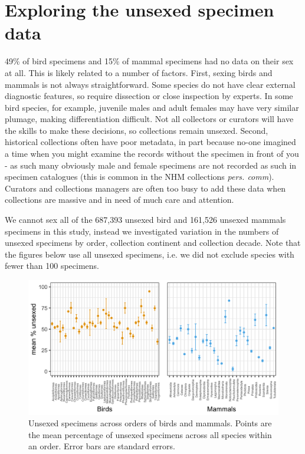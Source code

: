 \documentclass[a4paper, 12pt]{article}
\begin{document}
\newpage
\section{Exploring the unsexed specimen data}

49\% of bird specimens and 15\% of mammal specimens had no data on their sex at all. This is likely related to a number of factors. 
First, sexing birds and mammals is not always straightforward. Some species do not have clear external diagnostic features, so require dissection or close inspection by experts. 
In some bird species, for example, juvenile males and adult females may have very similar plumage, making differentiation difficult. 
Not all collectors or curators will have the skills to make these decisions, so collections remain unsexed. 
Second, historical collections often have poor metadata, in part because no-one imagined a time when you might examine the records without the specimen in front of you - as such many obviously male and female specimens are not recorded as such in specimen catalogues (this is common in the NHM collections \textit{pers. comm}).
 Curators and collections managers are often too busy to add these data when collections are massive and in need of much care and attention. 

We cannot sex all of the 687,393 unsexed bird and 161,526 unsexed mammals specimens in this study, instead we investigated variation in the numbers of unsexed specimens by order, collection continent and collection decade. 
Note that the figures below use all unsexed specimens, i.e. we did not exclude species with fewer than 100 specimens.

\begin{figure}[H]
 \centering
  \includegraphics[width = \linewidth]{figures/nosex-orders.png}
  \caption{Unsexed specimens across orders of birds and mammals. 
  Points are the mean percentage of unsexed specimens across all species within an order. 
  Error bars are standard errors.}
  \label{fig-nosex-orders}
\end{figure}
\end{document}
